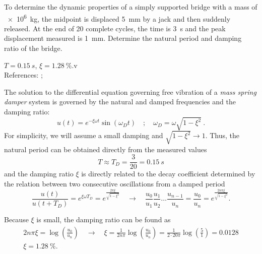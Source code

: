 
\begin{Exercise}[label={free_vibration}]
To determine the dynamic properties of a simply supported bridge with a mass of \SI{e6}{kg}, the midpoint is displaced \SI{5}{mm} by a jack and then suddenly released. At the end of 20 complete cycles, the time is \SI{3}{s} and the peak displacement measured is \SI{1}{mm}. Determine the natural period and damping ratio of the bridge.

\begin{center}
\end{center}

\shortAnswer $T=\SI{0.15}{s}$, $\xi=\SI{1.28}{\%}$.v \\
References: \cite[p. 49]{chopra}; \cite[p. 287]{blanco}
\end{Exercise}



\begin{Answer}[ref={free_vibration}]
The solution to the differential equation governing free vibration of a \emph{mass spring damper} system is governed by the natural and damped frequencies and the damping ratio:
$$
u(t) = e^{-\xi\omega t}\sin(\omega_D t) \quad ; \quad \omega_D = \omega\sqrt{1-\xi^2}\ .
$$
For simplicity, we will assume a small damping and $\sqrt{1-\xi^2}\rightarrow1$. Thus, the natural period can be obtained directly from the measured values
$$
T \approx T_D = \frac{3}{20} = \SI{0.15}{s}
$$
and the damping ratio $\xi$ is directly related to the decay coefficient determined by the relation between two consecutive oscillations from a damped period
$$
\frac{u(t)}{u(t+T_D)} = e^{\xi\omega T_D} = e^{\frac{2\pi\xi}{\sqrt{1-\xi^2}}} \quad \rightarrow \quad
\frac{u_0}{u_1} \frac{u_1}{u_2} \dots \frac{u_{n-1}}{u_n} = \frac{u_0}{u_n} = e^{\frac{2n\pi\xi}{\sqrt{1-\xi^2}}}.
$$

Because $\xi$ is small, the damping ratio can be found as
\begin{align*}
2n\pi\xi = \log\left(\frac{u_0}{u_n}\right) \quad \rightarrow \quad
\xi = \frac{1}{2n\pi} \log\left(\frac{u_0}{u_n}\right) = \frac{1}{2\cdot20\pi} \log\left(\frac{5}{1}\right) = 0.0128 \\
\xi = \SI{1.28}{\%}.
\end{align*}    

\end{Answer}